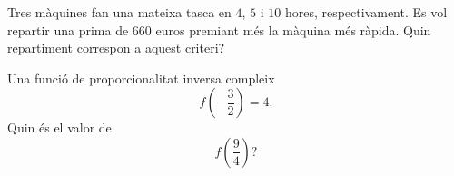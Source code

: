 \begin{enumerate}
\pregunta Tres màquines fan una mateixa tasca en \(4\), \(5\) i \(10\) hores, respectivament. Es vol repartir una prima de \(660\) euros premiant més la màquina més ràpida. Quin repartiment correspon a aquest criteri?
\begin{enumerate}
\end{enumerate}
\feedback

\pregunta Una funció de proporcionalitat inversa compleix
\[
	f\left(-\frac{3}{2}\right)=4.
\]
Quin és el valor de
\[
	f\left(\frac{9}{4}\right)?
\]
\begin{enumerate}
\end{enumerate}
\feedback
\end{enumerate}

